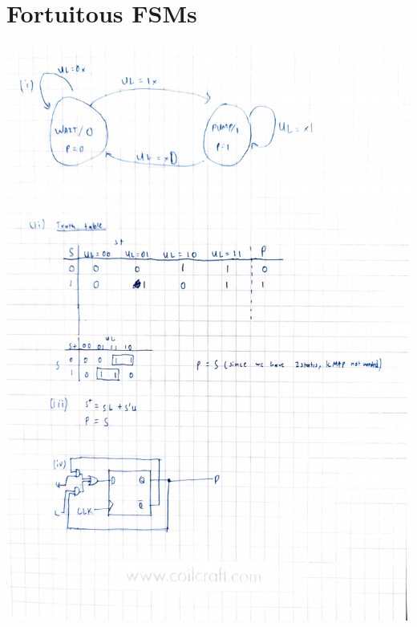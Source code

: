 \documentclass{article}
\begin{document}
    \section{Fortuitous FSMs}
    \includegraphics[scale=0.75]{figures/7a sol.pdf}
\end{document}
